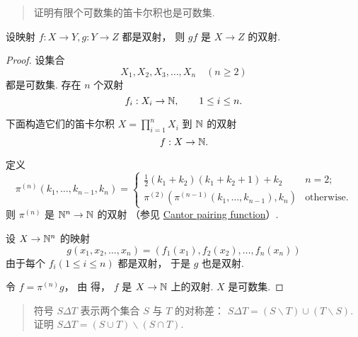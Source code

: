 \begin{quotation}
    证明有限个可数集的笛卡尔积也是可数集.
\end{quotation}

\begin{lemma}\label{lem:ch01:sec05:2}
    设映射 $f: X \to Y, g: Y \to Z$ 都是双射，
    则 $gf$ 是 $X \to Z$ 的双射.
\end{lemma}

\begin{proof}
    设集合
    \[
        X_1, X_2, X_3, \dots, X_n \quad(n \ge 2)
    \]
    都是可数集. 存在 $n$ 个双射
    \begin{equation}
        f_i: X_i \to \mathbb{N}, \qquad 1 \le i \le n.
    \end{equation}

    下面构造它们的笛卡尔积
    $X = \prod_{i=1}^n{X_i}$
    到
    $\mathbb{N}$
    的双射
    \begin{equation*}
        f: X \to \mathbb{N}.
    \end{equation*}

    定义
    \begin{equation}
        \pi^{(n)}(k_1, \dots, k_{n-1}, k_n) = \begin{cases}
            \frac{1}{2}(k_1 + k_2)(k_1 + k_2 + 1) + k_2 & n = 2; \\
            \pi^{(2)}(
                \pi^{(n - 1)}(k_1, \dots, k_{n-1}),
                k_n
            ) & \text{otherwise}.
        \end{cases}
    \end{equation}
    则 $\pi^{(n)}$ 是 $\mathbb{N}^n \to \mathbb{N}$ 的双射
    （参见 \href{https://en.wikipedia.org/wiki/Pairing_function#Cantor_pairing_function}{Cantor pairing function}）.

    设 $X \to \mathbb{N}^n$ 的映射
    \begin{equation}
        g(x_1, x_2, \dots, x_n) = (f_1(x_1), f_2(x_2), \dots, f_n(x_n))
    \end{equation}
    由于每个 $f_i (1 \le i \le n)$ 都是双射，
    于是 $g$ 也是双射.

    令 $f = \pi^{(n)}g$，
    由 得，
    $f$ 是 $X \to \mathbb{N}$ 上的双射.
    $X$ 是可数集.
\end{proof}

\begin{quotation}
    符号 $S \Delta T$ 表示两个集合 $S$ 与 $T$ 的对称差：
    $S \Delta T = (S \backslash T)\cup(T \backslash S).$
    证明 $S \Delta T = (S \cup T)\backslash(S \cap T).$
\end{quotation}

